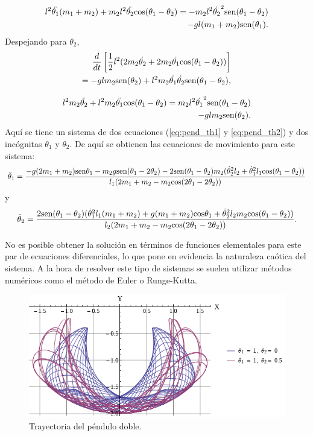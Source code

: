 \documentclass[letterpaper,11pt]{article}
\begin{document}
\begin{align} \label{eq:pend_th1}
	l^2 \ddot{\theta_1} (m_1 + m_2) + m_2 l^2 \ddot{\theta_2} \hbox{cos}(\theta_1 - \theta_2) = -m_2 l^2 \dot{\theta_2}^2 \hbox{sen} (\theta_1 - \theta_2) \nonumber \\
	- gl(m_1 + m_2) \hbox{sen} (\theta_1).
\end{align}
Despejando para $\theta_2$,
\begin{align}
	{d\over dt }\left[ \frac{1}{2} l^2 (2m_2 \dot{\theta_2} + 2m_2 \dot{\theta_1} \hbox{cos} (\theta_1 - \theta_2)) \right] \nonumber \\
	= -g l m_2 \hbox{sen}(\theta_2) + l^2 m_2 \dot{\theta_1} \dot{\theta_2} \hbox{sen} (\theta_1 - \theta_2) \nonumber,
\end{align}

\begin{align} \label{eq:pend_th2}
	l^2 m_2 \ddot{\theta_2} + l^2 m_2 \ddot{\theta_1} \hbox{cos} (\theta_1 - \theta_2) = m_2 l^2 \dot{\theta_1}^2 \hbox{sen}(\theta_1 - \theta_2) \nonumber \\
	- g l m_2 \hbox{sen}(\theta_2).
\end{align}
Aquí se tiene un sistema de dos ecuaciones (\ref{eq:pend_th1} y \ref{eq:pend_th2}) y dos incógnitas $\theta_1$ y $\theta_2$. De aquí se obtienen las ecuaciones de movimiento para este sistema:
\begin{equation}
	\ddot\theta_1 = \frac {-g (2m_1+m_2)\hbox{sen} \theta_1 -m_2g \hbox{sen}(\theta_1-2\theta_2)-
	2\hbox{sen}(\theta_1-\theta_2)m_2(\dot\theta_2^2 l_2 + \dot\theta_1^2 l_1\hbox{cos}(\theta_1-\theta_2))}
	{l_1(2m_1+m_2-m_2 \hbox{cos}(2\theta_1 -2\theta_2))}
\end{equation}
y 
\begin{equation}
	\ddot\theta_2 = \frac {2 \hbox{sen}(\theta_1 - \theta_2) (\dot\theta_1^2 l_1 (m_1 + m_2) 
	+ g(m_1 + m_2) \hbox{cos} \theta_1 + \dot\theta_2^2 l_2 m_2 \hbox{cos}(\theta_1 - \theta_2)) } 
	{l_2 (2 m_1 + m_2 - m_2 \hbox{cos}(2 \theta_1 - 2 \theta_2))}.
\end{equation}

No es posible obtener la solución en términos de funciones elementales para este par de ecuaciones diferenciales, lo que pone en evidencia la naturaleza caótica del sistema. A la hora de resolver este tipo de sistemas se suelen utilizar métodos numéricos como el método de Euler o Runge-Kutta.

\begin{figure}[h!]
\centering
\includegraphics[scale=0.60]{img/PendDobleTray}
\caption{Trayectoria del péndulo doble.}
\label{fig:penddobletray}
\end{figure}
\end{document}
